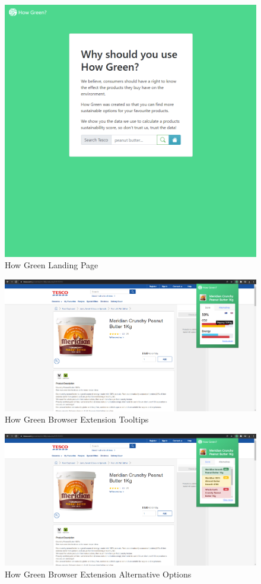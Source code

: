 \documentclass[a4,10pt,twocolumn]{article}
\begin{document}
\begin{figure}[h]
    \centering
    \includegraphics[width=0.9\columnwidth]{assets/final/landing_page.png}
    \caption{How Green Landing Page}
\end{figure}

\begin{figure}[h]
    \centering
    \includegraphics[width=0.9\columnwidth]{assets/final/extension_tooltips.png}
    \caption{How Green Browser Extension Tooltips}
\end{figure}

\begin{figure}[h]
    \centering
    \includegraphics[width=0.9\columnwidth]{assets/final/product_page_with_alternatives.png}
    \caption{How Green Browser Extension Alternative Options}
\end{figure}
\end{document}
